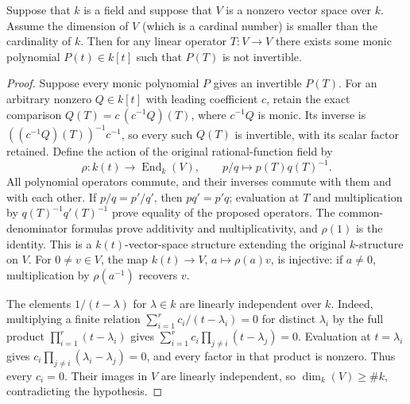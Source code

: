 \begin{lemma}
\label{lemma-dimension}
Suppose that $k$ is a field and suppose that $V$ is a nonzero vector
space over $k$. Assume the dimension of $V$ (which is a cardinal number)
is smaller than the cardinality of $k$. Then for any linear operator
$T : V \to V$ there exists some monic polynomial $P(t) \in k[t]$ such that
$P(T)$ is not invertible.
\end{lemma}

\begin{proof}
Suppose every monic polynomial $P$ gives an invertible $P(T)$.
For an arbitrary nonzero $Q\in k[t]$ with leading coefficient $c$,
retain the exact comparison
$Q(T)=c\,(c^{-1}Q)(T)$, where $c^{-1}Q$ is monic.
Its inverse is $((c^{-1}Q)(T))^{-1}c^{-1}$, so every such $Q(T)$
is invertible, with its scalar factor retained.
Define the action of the original rational-function field by
$$
\rho:k(t)\longrightarrow\operatorname{End}_k(V),\qquad
p/q\longmapsto p(T)q(T)^{-1}.
$$
All polynomial operators commute, and their inverses commute with
them and with each other. If $p/q=p'/q'$, then $pq'=p'q$;
evaluation at $T$ and multiplication by $q(T)^{-1}q'(T)^{-1}$
prove equality of the proposed operators. The common-denominator
formulas prove additivity and multiplicativity, and $\rho(1)$ is
the identity. This is a $k(t)$-vector-space structure extending
the original $k$-structure on $V$. For $0\ne v\in V$, the map
$k(t)\to V$, $a\mapsto\rho(a)v$, is injective: if $a\ne0$,
multiplication by $\rho(a^{-1})$ recovers $v$.

\medskip\noindent
The elements $1/(t-\lambda)$ for $\lambda\in k$ are linearly
independent over $k$. Indeed, multiplying a finite relation
$\sum_{i=1}^r c_i/(t-\lambda_i)=0$ for distinct $\lambda_i$ by
the full product $\prod_{i=1}^r(t-\lambda_i)$ gives
$\sum_{i=1}^r c_i\prod_{j\ne i}(t-\lambda_j)=0$.
Evaluation at $t=\lambda_i$ gives
$c_i\prod_{j\ne i}(\lambda_i-\lambda_j)=0$, and every factor
in that product is nonzero. Thus every $c_i=0$.
Their images in $V$ are linearly independent, so
$\dim_k(V)\geq\#k$, contradicting the hypothesis.
\end{proof}